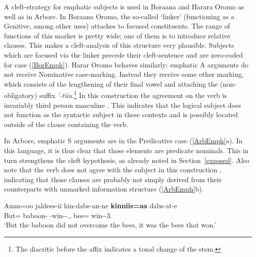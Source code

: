 A cleft-strategy for emphatic subjects is used in Boraana and Harara Oromo as well as in Arbore. 
In Boraana Oromo, the so-called `linker' (functioning as a Genitive, among other uses) attaches to focused constituents. 
The range of functions of this marker is pretty wide; one of them is to introduce relative clauses. 
This makes a cleft-analysis of this structure very plausible. 
Subjects which are focused via the linker precede their cleft-sentence and are zero-coded for case (\ref{BorEmph}). 
Harar Oromo behaves similarly: emphatic A arguments do not receive Nominative  case-marking. 
Instead they receive some other marking, which consists of the lengthening of their final vowel and attaching the (non-obligatory) suffix \emph{{'}-t\'uu}.\footnote{The diacritic before the affix indicates a tonal change of the stem.} 
In this construction the agreement on the verb is invariably third person masculine \citep[108]{Owens:1985}. 
This indicates that the logical subject does not function as the syntactic subject in these contexts and is possibly located outside of the clause containing the verb.  %

In Arbore, emphatic S arguments are in the Predicative case (\ref{ArbEmph}a). 
In this language, it is thus clear that those elements are predicate nominals. 
This in turn strengthens the cleft hypothesis, as already noted in Section~\ref{exposed}. 
Also note that the verb does not agree with the subject in this construction \citep[113--114]{Hayward:1984}, indicating that those clauses are probably not simply derived from their counterparts with unmarked information structure (\ref{ArbEmph}b).

\begin{exe} \ex\label{BorEmph}
\raggedright
\gll Amm=oo jaldees-ii hin-dabs-an-ne \textbf{kinniis=aa} dabs-at-e\\
But=\lin{}  baboon-\nom{} \Neg{}-win-\Mid{}-\Neg{}.\pst{}, bee=\lin{} win-\Mid{}-3\mas{}.\pst{}\\
\glt `But the baboon did not overcome the bees, it was the bees that won.'
\end{exe} 

